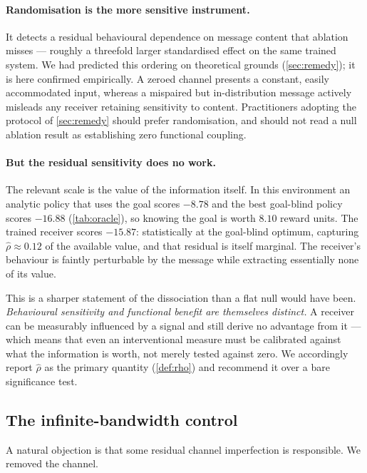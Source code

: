 \documentclass[11pt,a4paper]{article}
\theoremstyle{plain}
\theoremstyle{definition}
\theoremstyle{remark}
\begin{document}
\paragraph{Randomisation is the more sensitive instrument.}
It detects a residual behavioural dependence on message content that ablation misses --- roughly a
threefold larger standardised effect on the same trained system. We had predicted this ordering on
theoretical grounds (\cref{sec:remedy}); it is here confirmed empirically. A zeroed channel presents
a constant, easily accommodated input, whereas a mispaired but in-distribution message actively
misleads any receiver retaining sensitivity to content. Practitioners adopting the protocol of
\cref{sec:remedy} should prefer randomisation, and should not read a null ablation result as
establishing zero functional coupling.

\paragraph{But the residual sensitivity does no work.}
The relevant scale is the value of the information itself. In this environment an analytic policy
that uses the goal scores $-8.78$ and the best goal-blind policy scores $-16.88$
(\cref{tab:oracle}), so knowing the goal is worth $8.10$ reward units. The trained receiver scores
$-15.87$: statistically at the goal-blind optimum, capturing $\hat{\rho} \approx 0.12$ of the
available value, and that residual is itself marginal. The receiver's behaviour is faintly
perturbable by the message while extracting essentially none of its value.

This is a sharper statement of the dissociation than a flat null would have been.
\emph{Behavioural sensitivity and functional benefit are themselves distinct.} A receiver can be
measurably influenced by a signal and still derive no advantage from it --- which means that even
an interventional measure must be calibrated against what the information is worth, not merely
tested against zero. We accordingly report $\hat{\rho}$ as the primary quantity
(\cref{def:rho}) and recommend it over a bare significance test.

\subsection{The infinite-bandwidth control}\label{sec:oracle}

A natural objection is that some residual channel imperfection is responsible. We removed the
channel.
\end{document}
